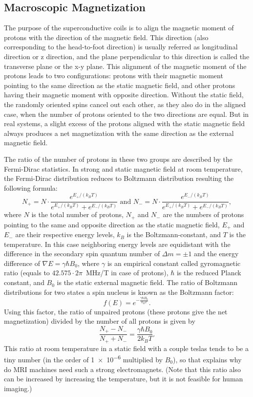 \subsection{Macroscopic Magnetization}
The purpose of the superconductive coils is to align the magnetic moment of protons with the direction of the magnetic field. This direction (also corresponding to the head-to-foot direction) is usually referred as longitudinal direction or z direction, and the plane perpendicular to this direction is called the transverse plane or the x-y plane. This alignment of the magnetic moment of the protons leads to two configurations: protons with their magnetic moment pointing to the same direction as the static magnetic field, and other protons having their magnetic moment with opposite direction. Without the static field, the randomly oriented spins cancel out each other, as they also do in the aligned case, when the number of protons oriented to the two directions are equal. But in real systems, a slight excess of the protons aligned with the static magnetic field always produces a net magnetization with the same direction as the external magnetic field.

The ratio of the number of protons in these two groups are described by the Fermi-Dirac statistics. In strong and static magnetic field at room temperature, the Fermi-Dirac distribution reduces to Boltzmann distribution resulting the following formula:
\[N_+ = N \cdot \frac{e^{E_+ / (k_B T)}}{e^{E_+ / (k_B T)} + e^{E_- / (k_B T)}} \text{ and } N_- = N \cdot \frac{e^{E_- / (k_B T)}}{e^{E_+ / (k_B T)} + e^{E_- / (k_B T)}},\]
where $N$ is the total number of protons, $N_+$ and $N_-$ are the numbers of protons pointing to the same and opposite direction as the static magnetic field, $E_+$ and $E_-$ are their respective energy levels, $k_B$ is the Boltzmann-constant, and $T$ is the temperature. In this case neighboring energy levels are equidistant with the difference in the secondary spin quantum number of $\Delta m = \pm 1$ and the energy difference of $\nabla E = \gamma \hbar B_0$, where $\gamma$ is an empirical constant called gyromagnetic ratio (equals to $42.575 \cdot 2\pi$\SI{}{\mega\hertz/\tesla} in case of protons), $\hbar$ is the reduced Planck constant, and $B_0$ is the static external magnetic field. The ratio of Boltzmann distributions for two states a spin \textonehalf nucleus is known as the Boltzmann factor:
\[f(E) = e^{-\frac{\gamma \hbar B_0}{k_B T}}.\]
Using this factor, the ratio of unpaired protons (these protons give the net magnetization) divided by the number of all protons is given by
\[\frac{N_+ - N_-}{N_+ + N_-} = \frac{\gamma \hbar B_0}{2 k_B T}.\]
This ratio at room temperature in a static field with a couple teslas tends to be a tiny number (in the order of \num{1e-6} multiplied by $B_0$), so that explains why do MRI machines need such a strong electromagnets. (Note that this ratio also can be increased by increasing the temperature, but it is not feasible for human imaging.)

